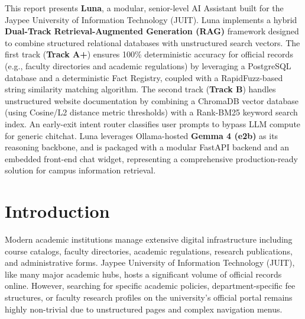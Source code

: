 \documentclass[12pt,a4paper]{article}
\begin{document}
This report presents \textbf{Luna}, a modular, senior-level AI Assistant built for the Jaypee University of Information Technology (JUIT). Luna implements a hybrid \textbf{Dual-Track Retrieval-Augmented Generation (RAG)} framework designed to combine structured relational databases with unstructured search vectors. The first track (\textbf{Track A+}) ensures 100\% deterministic accuracy for official records (e.g., faculty directories and academic regulations) by leveraging a PostgreSQL database and a deterministic Fact Registry, coupled with a RapidFuzz-based string similarity matching algorithm. The second track (\textbf{Track B}) handles unstructured website documentation by combining a ChromaDB vector database (using Cosine/L2 distance metric thresholds) with a Rank-BM25 keyword search index. An early-exit intent router classifies user prompts to bypass LLM compute for generic chitchat. Luna leverages Ollama-hosted \textbf{Gemma 4 (e2b)} as its reasoning backbone, and is packaged with a modular FastAPI backend and an embedded front-end chat widget, representing a comprehensive production-ready solution for campus information retrieval.

\newpage

\tableofcontents
\vspace{1.0cm}
\listoffigures
\vspace{1.0cm}
\listoftables

\newpage
{}
\setcounter{page}{1}

\section{Introduction}
Modern academic institutions manage extensive digital infrastructure including course catalogs, faculty directories, academic regulations, research publications, and administrative forms. Jaypee University of Information Technology (JUIT), like many major academic hubs, hosts a significant volume of official records online. However, searching for specific academic policies, department-specific fee structures, or faculty research profiles on the university's official portal remains highly non-trivial due to unstructured pages and complex navigation menus.
\end{document}
